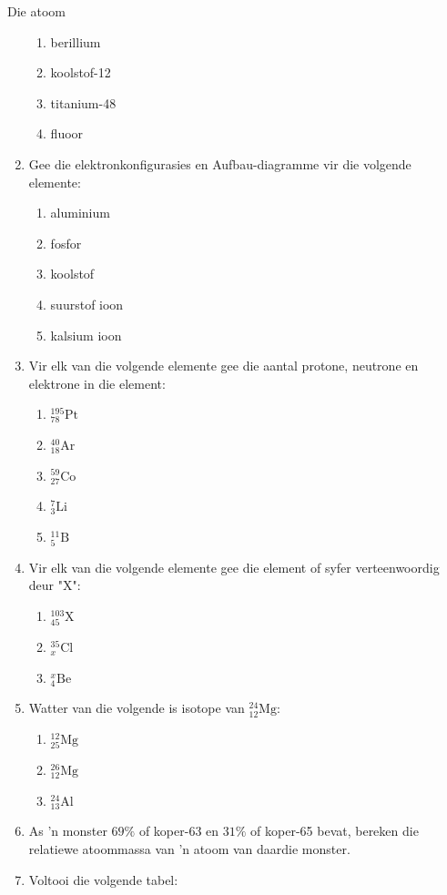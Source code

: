 \begin{eocexercises}{Die atoom}
\begin{enumerate}[noitemsep, label=\textbf{\arabic*}. ]
\begin{enumerate}[noitemsep, label=\textbf{\alph*}. ]
            \item berillium
\item koolstof-12
\item titanium-48
\item fluoor
\end{enumerate}
\item Gee die elektronkonfigurasies en Aufbau-diagramme vir die volgende elemente:
\label{m38741*id7624}\begin{enumerate}[noitemsep, label=\textbf{\alph*}. ] 
            \item aluminium
\item fosfor
\item koolstof
\item suurstof ioon
\item kalsium ioon
\end{enumerate}
\item Vir elk van die volgende elemente gee die aantal protone, neutrone en elektrone in die element: 
\begin{enumerate}[noitemsep, label=\textbf{\alph*}. ] 
\item $_{78}^{195}\text{Pt}$
\item $_{18}^{40}\text{Ar}$
\item $_{27}^{59}\text{Co}$
\item $_{3}^{7}\text{Li}$
\item $_{5}^{11}\text{B}$
\end{enumerate}
\item Vir elk van die volgende elemente gee die element of syfer verteenwoordig deur "X": \label{m38741*id7434324}\begin{enumerate}[noitemsep, label=\textbf{\alph*}. ] 
            \item $_{45}^{103}\text{X}$
\item $_{x}^{35}\text{Cl}$
\item $_{4}^{x}\text{Be}$
\end{enumerate}
\item Watter van die volgende is isotope van $_{12}^{24}\text{Mg}$: \label{m38741*id743234}
\begin{enumerate}[noitemsep, label=\textbf{\alph*}. ] 
            \item $_{25}^{12}\text{Mg}$
\item $_{12}^{26}\text{Mg}$
\item $_{13}^{24}\text{Al}$
\end{enumerate}
\item As  'n monster $69\%$ of koper-63 en $31\%$ of koper-65 bevat, bereken die relatiewe atoommassa van  'n atoom van daardie monster.
            \item Voltooi die volgende tabel:
          \begin{table}[H]
        \begin{center}
      

\end{center}
\end{table}
\end{enumerate}
\end{eocexercises}
